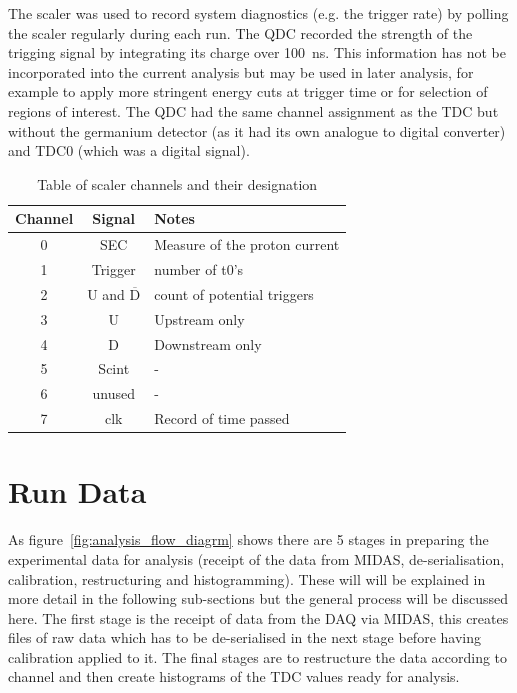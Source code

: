 \documentclass[]{article}
\begin{document}
The scaler was used to record system diagnostics (e.g. the trigger rate) by polling the scaler regularly during each run. The QDC recorded the strength of the trigging signal by integrating its charge over 100~ns. This information has not be incorporated into the current analysis but may be used in later analysis, for example to apply more stringent energy cuts at trigger time or for selection of regions of interest. The QDC had the same channel assignment as the TDC but without the germanium detector (as it had its own analogue to digital converter) and TDC0 (which was a digital signal).
\begin{table}
    \centering
    \begin{tabular}{c|c|l}
        Channel & Signal & Notes\\
        \hline
        0 & SEC & Measure of the proton current\\
        1 & Trigger & number of t0's\\
        2 & U and $\overline{\text{D}}$ & count of potential triggers\\
        3 & U & Upstream only\\
        4 & D & Downstream only\\
        5 & Scint & -\\
        6 & unused & -\\
        7 & clk & Record of time passed\\
    \end{tabular}
    \caption{Table of scaler channels and their designation}
    \label{tab:scaler_chs}
\end{table}

\section{Run Data} %
\label{sec:run_data}
As figure~\ref{fig:analysis_flow_diagrm} shows there are 5 stages in preparing the experimental data for analysis (receipt of the data from MIDAS, de-serialisation, calibration, restructuring and histogramming). These will will be explained in more detail in the following sub-sections but the general process will be discussed here. The first stage is the receipt of data from the DAQ via MIDAS, this creates files of raw data which has to be de-serialised in the next stage before having calibration applied to it. The final stages are to restructure the data according to channel and then create histograms of the TDC values ready for analysis. 
\end{document}
